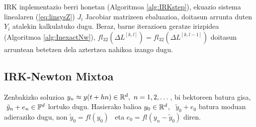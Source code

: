 IRK inplementazio berri honetan (Algoritmoa \ref{alg:IRKstep}), ekuazio sistema linealaren (\ref{eq:linsysZ}) $J_i$ Jacobiar matrizeen ebaluazioa, doitasun arrunta duten $Y_i$ atalekin kalkulatuko dugu. Beraz, barne iterazioen geratze irizpidea (Algoritmoa \ref{alg:InexactNw}),  $fl_{32}(\Delta L^{[k,l]})=fl_{32}(\Delta L^{[k,l-1]})$ doitasun arruntean betetzen dela aztertzea nahikoa izango dugu.  

\subsection{IRK-Newton Mixtoa}
\label{ss:ss762}

Zenbakizko soluzioa $y_n \approx y(t+hn) \in \mathbb{R}^{d}, \ n=1,2,\dots$, bi bektoreen batura gisa, $ \ \tilde{y}_n+e_n \in \mathbb{F}^{d}$ lortuko dugu. Hasierako balioa $y_0 \in \mathbb{R}^{d}$, \ $\tilde{y}_0+e_0$ batura moduan adieraziko dugu, non $\tilde{y}_0=fl(y_0)$~ eta $e_0=fl(y_n-\tilde{y}_0)$ diren. 

